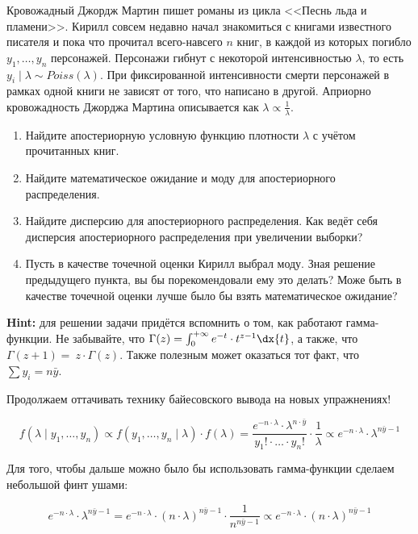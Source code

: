 \begin{problem}
Кровожадный Джордж Мартин пишет романы из цикла <<Песнь льда и пламени>>. Кирилл совсем недавно начал знакомиться с книгами известного писателя и пока что прочитал всего-навсего $n$ книг, в каждой из которых погибло $y_1, \ldots, y_n$ персонажей. Персонажи гибнут с некоторой интенсивностью $\lambda$, то есть  $y_i \mid \lambda \sim Poiss(\lambda)$. При фиксированной интенсивности смерти персонажей в рамках одной книги не зависят от того, что написано в другой. Априорно кровожадность Джорджа Мартина описывается как $\lambda \propto \frac{1}{\lambda}$.

\begin{enumerate}
\item Найдите апостериорную условную функцию плотности $\lambda$ с учётом прочитанных книг.
\item Найдите математическое ожидание и моду для апостериорного распределения.
\item Найдите дисперсию для апостериорного распределения. Как ведёт себя дисперсия апостериорного распределения при увеличении выборки? 
\item Пусть в качестве точечной оценки Кирилл выбрал моду. Зная решение предыдущего пункта, вы бы порекомендовали ему это делать? Може быть в качестве точечной оценки лучше было бы взять математическое ожидание?
\end{enumerate}

\textbf{Hint:} для решении задачи придётся вспомнить о том, как работают гамма-функции. Не забывайте, что $ \Gamma(z) = \int_0^{+\infty} e^{-t} \cdot t^{z-1} \dx{t}$, а также, что $\Gamma(z+1) = \ z \cdot \Gamma(z)$. Также полезным может оказаться тот факт, что $\sum y_i = n \bar y$.

\begin{sol}

Продолжаем оттачивать технику байесовского вывода на новых упражнениях!

\[ f(\lambda \mid y_1, \ldots, y_n) \propto f(y_1, \dots, y_n \mid \lambda) \cdot f(\lambda) = \frac{e^{-n \cdot \lambda} \cdot \lambda^{n \cdot \bar y}}{y_1! \cdot \ldots \cdot y_n!} \cdot \frac{1}{\lambda} \propto e^{-n \cdot \lambda} \cdot \lambda^{n \bar y - 1} \]

Для того, чтобы дальше можно было бы использовать гамма-функции сделаем небольшой финт ушами:

\[ e^{-n \cdot \lambda} \cdot \lambda^{n \bar y - 1} = e^{-n \cdot \lambda} \cdot (n \cdot\lambda)^{n \bar y - 1} \cdot \frac{1}{n^{n \bar y - 1}} \propto e^{-n \cdot \lambda} \cdot (n \cdot\lambda)^{n \bar y - 1} \]


\end{sol}
\end{problem}
